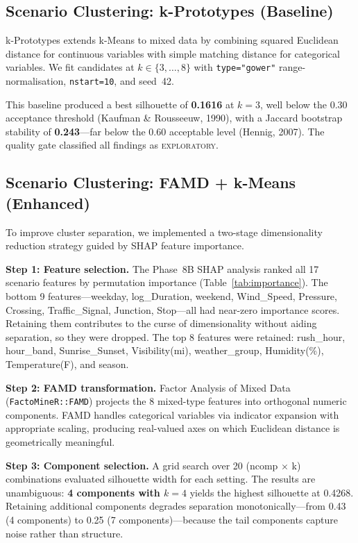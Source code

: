 \documentclass[11pt,letterpaper]{article}
\begin{document}
\subsection{Scenario Clustering: k-Prototypes (Baseline)}

k-Prototypes extends k-Means to mixed data by combining squared Euclidean distance for continuous variables with simple matching distance for categorical variables. We fit candidates at $k \in \{3, \ldots, 8\}$ with \texttt{type="gower"} range-normalisation, \texttt{nstart=10}, and seed~42.

This baseline produced a best silhouette of \textbf{0.1616} at $k=3$, well below the 0.30 acceptance threshold (Kaufman \& Rousseeuw, 1990), with a Jaccard bootstrap stability of \textbf{0.243}---far below the 0.60 acceptable level (Hennig, 2007). The quality gate classified all findings as \textsc{exploratory}.

\subsection{Scenario Clustering: FAMD + k-Means (Enhanced)}

To improve cluster separation, we implemented a two-stage dimensionality reduction strategy guided by SHAP feature importance.

\textbf{Step 1: Feature selection.} The Phase~8B SHAP analysis ranked all 17 scenario features by permutation importance (Table~\ref{tab:importance}). The bottom 9 features---weekday, log\_Duration, weekend, Wind\_Speed, Pressure, Crossing, Traffic\_Signal, Junction, Stop---all had near-zero importance scores. Retaining them contributes to the curse of dimensionality without aiding separation, so they were dropped. The top 8 features were retained: rush\_hour, hour\_band, Sunrise\_Sunset, Visibility(mi), weather\_group, Humidity(\%), Temperature(F), and season.

\textbf{Step 2: FAMD transformation.} Factor Analysis of Mixed Data (\texttt{FactoMineR::FAMD}) projects the 8 mixed-type features into orthogonal numeric components. FAMD handles categorical variables via indicator expansion with appropriate scaling, producing real-valued axes on which Euclidean distance is geometrically meaningful.

\textbf{Step 3: Component selection.} A grid search over 20 (ncomp $\times$ k) combinations evaluated silhouette width for each setting. The results are unambiguous: \textbf{4 components with $k=4$} yields the highest silhouette at 0.4268. Retaining additional components degrades separation monotonically---from 0.43 (4 components) to 0.25 (7 components)---because the tail components capture noise rather than structure.
\end{document}
